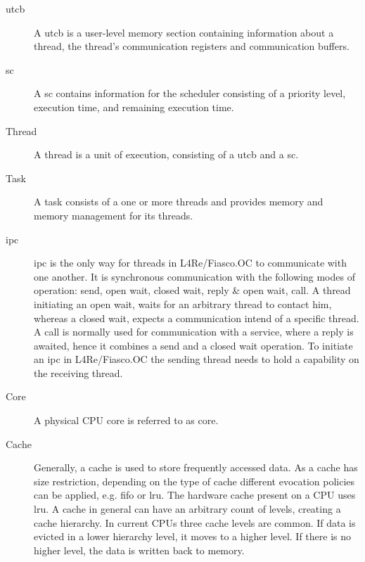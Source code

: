\begin{description}
  \item[\Gls{utcb}] A \gls{utcb} is a user-level memory section containing
    information about a thread, the thread's communication registers and
    communication buffers.

  \item[\Gls{sc}] A \gls{sc} contains information for the scheduler consisting
    of a priority level, execution time, and remaining execution time.

  \item[Thread] A thread is a unit of execution, consisting of a \gls{utcb}
    and a \gls{sc}.

  \item[Task] A task consists of a one or more threads and provides memory and
    memory management for its threads.

  \item[\Gls{ipc}] \Gls{ipc} is the only way for threads in L4Re/Fiasco.OC
    to communicate with one another.
    It is synchronous communication with the following modes of operation:
    send, open wait, closed wait, reply \& open wait, call.
    A thread initiating an open wait, waits for an arbitrary thread to contact
    him, whereas a closed wait, expects a communication intend of a specific
    thread.
    A call is normally used for communication with a service, where a reply is
    awaited, hence it combines a send and a closed wait operation.
    To initiate an \gls{ipc} in L4Re/Fiasco.OC the sending thread needs to hold
    a capability on the receiving thread.


  \item[Core] A physical CPU core is referred to as core.

  \item[Cache] Generally, a cache is used to store frequently accessed data.
    As a cache has size restriction, depending on the type of cache different
    evocation policies can be applied, e.g. \gls{fifo} or \gls{lru}.
    The hardware cache present on a CPU uses \gls{lru}.
    A cache in general can have an arbitrary count of levels, creating a cache
    hierarchy.
    In current CPUs three cache levels are common.
    If data is evicted in a lower hierarchy level, it moves to a higher level.
    If there is no higher level, the data is written back to memory.


\end{description}
